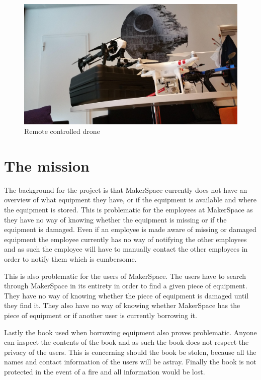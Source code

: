 \begin{figure}
    \centering
    \includegraphics[width=115mm,scale=1]{figures/makerspace.png}
    \caption{Remote controlled drone}
    \label{fig:makerspace}
\end{figure}

\section{The mission}
The background for the project is that MakerSpace currently does not have an overview of what equipment they have, or if the equipment is available and where the equipment is stored.
This is problematic for the employees at MakerSpace as they have no way of knowing whether the equipment is missing or if the equipment is damaged.
Even if an employee is made aware of missing or damaged equipment the employee currently has no way of notifying the other employees and as such the employee will have to manually contact the other employees in order to notify them which is cumbersome.

This is also problematic for the users of MakerSpace.
The users have to search through MakerSpace in its entirety in order to find a given piece of equipment.
They have no way of knowing whether the piece of equipment is damaged until they find it.
They also have no way of knowing whether MakerSpace has the piece of equipment or if another user is currently borrowing it.

Lastly the book used when borrowing equipment also proves problematic.
Anyone can inspect the contents of the book and as such the book does not respect the privacy of the users.
This is concerning should the book be stolen, because all the names and contact information of the users will be astray.
Finally the book is not protected in the event of a fire and all information would be lost.

